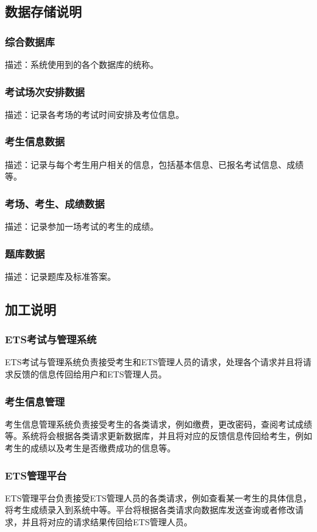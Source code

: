 \subsection{数据存储说明}
\subsubsection{综合数据库}
描述：系统使用到的各个数据库的统称。

\subsubsection{考试场次安排数据}
描述：记录各考场的考试时间安排及考位信息。
\subsubsection{考生信息数据}
描述：记录与每个考生用户相关的信息，包括基本信息、已报名考试信息、成绩等。
\subsubsection{考场、考生、成绩数据}
描述：记录参加一场考试的考生的成绩。
\subsubsection{题库数据}
描述：记录题库及标准答案。


\subsection{加工说明}
\subsubsection{ETS考试与管理系统}
ETS考试与管理系统负责接受考生和ETS管理人员的请求，处理各个请求并且将请求反馈的信息传回给用户和ETS管理人员。

\subsubsection{考生信息管理}
考生信息管理系统负责接受考生的各类请求，例如缴费，更改密码，查阅考试成绩等。系统将会根据各类请求更新数据库，并且将对应的反馈信息传回给考生，例如考生的成绩以及考生是否缴费成功的信息等。

\subsubsection{ETS管理平台}
ETS管理平台负责接受ETS管理人员的各类请求，例如查看某一考生的具体信息，将考生成绩录入到系统中等。平台将根据各类请求向数据库发送查询或者修改请求，并且将对应的请求结果传回给ETS管理人员。

